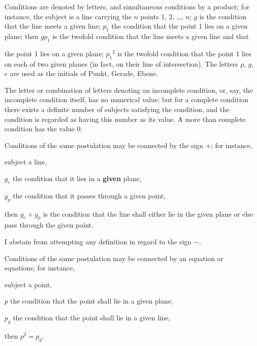 \documentclass[11pt,a4paper,english]{article}
\theoremstyle{plain}
\begin{document}
Conditions are denoted by letters, and simultaneous conditions by a product; for instance, the subject is a line carrying the $n$ points 1, 2, \ldots, $n$; $g$ is the condition that the line meets a given line; $p_1$ the condition that the point 1 lies on a given plane; then $gp_1$ is the twofold condition that the line meets a given line and that

\newpage
\noindent the point 1 lies on a given plane; ${p_1}^2$ is the twofold condition that the point 1 lies on each of two given planes (in fact, on their line of intersection). The letters $p$, $g$, $e$ are used as the initials of Punkt, Gerade, Ebene.

The letter or combination of letters denoting an incomplete condition, or, say, the incomplete condition itself, has no numerical value; but for a complete condition there exists a definite number of subjects satisfying the condition, and the condition is regarded as having this number as its value. A more than complete condition has the value 0.

Conditions of the same postulation may be connected by the sign $+$; for instance,

\hspace*{2em} subject a line,

\hspace*{2em} $g_e$ the condition that it lies in a \textbf{given} plane,

\hspace*{2em} $g_p$ the condition that it passes through a given point,

\hspace*{2em} then $g_e + g_p$ is the condition that the line shall either lie in the given plane or else pass through the given point.

I abstain from attempting any definition in regard to the sign $-$.

Conditions of the same postulation may be connected by an equation or equations; for instance,

\hspace*{2em} subject a point,

\hspace*{2em} $p$ the condition that the point shall lie in a given plane,

\hspace*{2em} $p_g$ the condition that the point shall lie in a given line,

\hspace*{2em} then $p^2 = p_g$.
\end{document}

